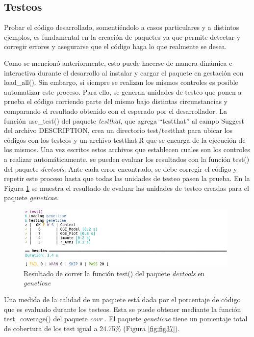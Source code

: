 \subsection{Testeos}

Probar el código desarrollado, somentiéndolo a casos particulares y a distintos ejemplos, es fundamental en la creación de paquetes ya que permite detectar y corregir errores y asegurarse que el código haga lo que realmente se desea.

Como se mencionó anteriormente, esto puede hacerse de manera dinámica e interactiva durante el desarrollo al instalar y cargar el paquete en gestación con \textcolor{fandango}{load\_all()}. Sin embargo, si siempre se realizan los mismos controles es posible automatizar este proceso. Para ello, se generan unidades de testeo que ponen a prueba el código corriendo parte del mismo bajo distintas circunstancias y comparando el resultado obtenido con el esperado por el desarrollador.  La función \textcolor{fandango}{use\_test()} del paquete \emph{testthat}, que agrega ``testthat'' al campo Suggest del archivo DESCRIPTION, crea un directorio test/testthat para ubicar los códigos con los testeos y un archivo testthat.R que se encarga de la ejecución de los mismos. Una vez escritos estos archivos que establecen cuales son los controles a realizar automáticamente, se pueden evaluar los resultados con la función \textcolor{fandango}{test()} del paquete \emph{devtools}. Ante cada error encontrado, se debe corregir el código y repetir este proceso hasta que todas las unidades de testeo pasen la prueba. En la Figura \ref{fig:fig36} se muestra el resultado de evaluar las unidades de testeo creadas para el paquete \emph{geneticae}.

\begin{figure}[h]
	\begin{center}
		\includegraphics[width=11cm]{./Graficos/Test.png}	
	\end{center}
	\caption{Resultado de correr la función \textcolor{fandango}{test()} del paquete \emph{devtools} en \emph{geneticae}}
	\label{fig:fig36}
\end{figure}

Una medida de la calidad de un paquete está dada por el porcentaje de código que es evaluado durante los testeos. Esta se puede obtener mediante la función \textcolor{fandango}{test\_coverage()} del paquete \emph{covr} \citep{Hester2020}. El paquete \emph{geneticae} tiene un porcentaje total de cobertura de los test igual a 24.75\% (Figura \ref{fig:fig37}).

